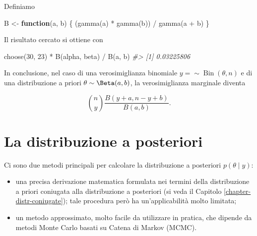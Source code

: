 \documentclass[
]{memoir}
\newenvironment{Shaded}{\begin{snugshade}}{\end{snugshade}}
\newcommand{\CommentTok}[1]{\textcolor[rgb]{0.56,0.35,0.01}{\textit{#1}}}
\newcommand{\ControlFlowTok}[1]{\textcolor[rgb]{0.13,0.29,0.53}{\textbf{#1}}}
\newcommand{\DecValTok}[1]{\textcolor[rgb]{0.00,0.00,0.81}{#1}}
\newcommand{\FunctionTok}[1]{\textcolor[rgb]{0.00,0.00,0.00}{#1}}
\newcommand{\NormalTok}[1]{#1}
\newcommand{\OtherTok}[1]{\textcolor[rgb]{0.56,0.35,0.01}{#1}}
\newcommand{\SpecialCharTok}[1]{\textcolor[rgb]{0.00,0.00,0.00}{#1}}
\providecommand{\tightlist}{%
  \setlength{\itemsep}{0pt}\setlength{\parskip}{0pt}}
\DeclareMathOperator{\Bin}{Bin} %
\theoremstyle{definition}
\theoremstyle{definition}
\theoremstyle{definition}
\theoremstyle{definition}
\theoremstyle{remark}
\begin{document}
\noindent
Definiamo

\begin{Shaded}
\begin{Highlighting}[]
\NormalTok{B }\OtherTok{\textless{}{-}} \ControlFlowTok{function}\NormalTok{(a, b) \{}
\NormalTok{  (}\FunctionTok{gamma}\NormalTok{(a) }\SpecialCharTok{*} \FunctionTok{gamma}\NormalTok{(b)) }\SpecialCharTok{/} \FunctionTok{gamma}\NormalTok{(a }\SpecialCharTok{+}\NormalTok{ b)}
\NormalTok{\}}
\end{Highlighting}
\end{Shaded}

\noindent
Il risultato cercato si ottiene con

\begin{Shaded}
\begin{Highlighting}[]
\FunctionTok{choose}\NormalTok{(}\DecValTok{30}\NormalTok{, }\DecValTok{23}\NormalTok{) }\SpecialCharTok{*} \FunctionTok{B}\NormalTok{(alpha, beta) }\SpecialCharTok{/} \FunctionTok{B}\NormalTok{(a, b)}
\CommentTok{\#\textgreater{} [1] 0.03225806}
\end{Highlighting}
\end{Shaded}

In conclusione, nel caso di una verosimiglianza binomiale \(y = \sim \Bin(\theta, n)\) e di una distribuzione a priori \(\theta \sim \Beta(a, b)\), la verosimiglianza marginale diventa

\begin{equation}
\binom{n}{y}\frac{B(y + a, n - y + b)}{B(a, b)}.
\label{eq:constant-norm-beta-binom}
\end{equation}

\hypertarget{la-distribuzione-a-posteriori}{%
\section{La distribuzione a posteriori}\label{la-distribuzione-a-posteriori}}

Ci sono due metodi principali per calcolare la distribuzione a posteriori \(p(\theta \mid y)\):

\begin{itemize}
\tightlist
\item
  una precisa derivazione matematica formulata nei termini della distribuzione a priori coniugata alla distribuzione a posteriori (si veda il Capitolo \ref{chapter-distr-coniugate}); tale procedura però ha un'applicabilità molto limitata;
\item
  un metodo approssimato, molto facile da utilizzare in pratica, che dipende da metodi Monte Carlo basati su Catena di Markov (MCMC).
\end{itemize}
\end{document}
